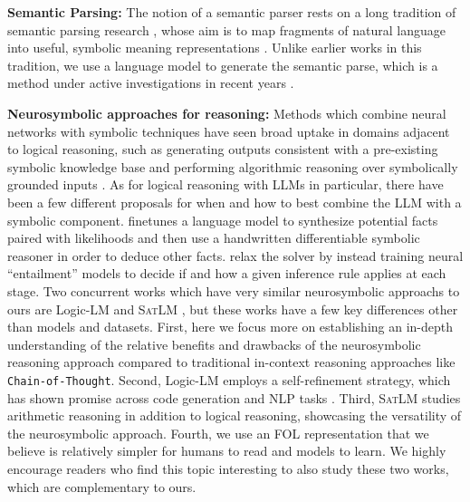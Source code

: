 \documentclass[11pt]{article}
\begin{document}
\textbf{Semantic Parsing:} The notion of a semantic parser rests on a long tradition of semantic parsing research \cite{kamath2019survey}, whose aim is to map fragments of natural language into useful, symbolic meaning representations \cite{zelle1996learning, zettlemoyer2005learning, berant2013semantic, liang2013learning, wong2023word}. Unlike earlier works in this tradition, we use a language model to generate the semantic parse, which is a method under active investigations in recent years \citep{shin2021few, drozdov2022compositional, lu2022parsing, wang2023grammar}.

\textbf{Neurosymbolic approaches for reasoning:}
Methods which combine neural networks with symbolic techniques have seen broad uptake in domains adjacent to logical reasoning, such as generating outputs consistent with a pre-existing symbolic knowledge base \citep{marra2019integrating,manhaeve2018deepproblog,zhang2023tractable} and performing algorithmic reasoning over symbolically grounded inputs \citep{ebrahimi2021towards,ibarz2022generalist,velivckovic2022clrs}.
As for logical reasoning with LLMs in particular, there have been a few different proposals for when and how to best combine the LLM with a symbolic component.
\citet{zhang22improved} finetunes a language model to synthesize potential facts paired with likelihoods and then use a handwritten differentiable symbolic reasoner in order to deduce other facts. 
\citet{weir2022dynamic} relax the solver by instead training neural ``entailment'' models to decide if and how a given inference rule applies at each stage. 
Two concurrent works which have very similar neurosymbolic approachs to ours are Logic-LM \cite{pan2023logic} and \textsc{SatLM} \cite{ye2023satisfiability}, but these works have a few key differences other than models and datasets. First, here we focus more on establishing an in-depth understanding of the relative benefits and drawbacks of the neurosymbolic reasoning approach compared to traditional in-context reasoning approaches like \texttt{Chain-of-Thought}. Second, Logic-LM employs a self-refinement strategy, which has shown promise across code generation and NLP tasks
\cite{zhang2023self,chen2023teaching,peng2023check,madaan2023self,olausson2023selfrepair}. Third, \textsc{SatLM} studies arithmetic reasoning in addition to logical reasoning, showcasing the versatility of the neurosymbolic approach. Fourth, we use an FOL representation that we believe is relatively simpler for humans to read and models to learn. We highly encourage readers who find this topic interesting to also study these two works, which are complementary to ours.
\end{document}
